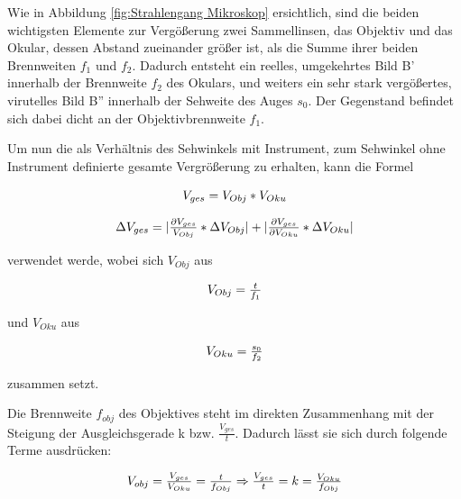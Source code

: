 \documentclass[12pt,a4paper,twoside]{article}
\begin{document}
\noindent
Wie in Abbildung \ref{fig:Strahlengang Mikroskop} ersichtlich, sind die beiden wichtigsten Elemente zur Vergößerung zwei Sammellinsen, das Objektiv und das Okular, dessen Abstand zueinander größer ist, als die Summe ihrer beiden Brennweiten $f_{1}$ und $f_{2}$. 
Dadurch entsteht ein reelles, umgekehrtes Bild B' innerhalb der Brennweite $f_{2}$ des Okulars, und weiters ein sehr stark vergößertes, virutelles Bild B'' innerhalb der Sehweite des Auges $s_{0}$. Der Gegenstand befindet sich dabei dicht an der Objektivbrennweite $f_{1}$. \newline

\noindent
Um nun die als Verhältnis des Sehwinkels mit Instrument, zum Sehwinkel ohne Instrument definierte gesamte Vergrößerung zu erhalten, kann die Formel

    \begin{equation}
        \label{eq:Gesamtvergrößerung}
        \centerline{$V_{ges}=V_{Obj}*V_{Oku}$}
    \end{equation}

    \begin{equation}
        \label{eq:Unsicherheit_Gesamtvergrößerung}
        \centerline{$\Delta V_{ges} = \vert \frac{\partial V_{ges}}{V_{Obj}} * \Delta V_{Obj} \vert + \vert \frac{\partial V_{ges}}{\partial V_{Oku}} * \Delta V_{Oku} \vert$}
    \end{equation}

\noindent
verwendet werde, wobei sich $V_{Obj}$ aus

\begin{equation}
    \label{eq:Objektivvergrößerung}
    \centerline{$V_{Obj}=\frac{t}{f_{1}}$}
\end{equation}

\noindent
und $V_{Oku}$ aus

\begin{equation}
    \label{eq:Okularvergrößerung}
    \centerline{$V_{Oku}=\frac{s_{0}}{f_{2}}$}
\end{equation}

\noindent
zusammen setzt. \newline

\noindent
Die Brennweite $f_{obj}$ des Objektives steht im direkten Zusammenhang mit der Steigung der Ausgleichsgerade k bzw. $\frac{V_{ges}}{t}$. Dadurch lässt sie sich durch folgende Terme ausdrücken:

\begin{equation}
    \label{eq:Objektivbrennweite}
    \centerline{$V_{obj}=\frac{V_{ges}}{V_{Oku}}=\frac{t}{f_{Obj}} \Rightarrow \frac{V_{ges}}{t} = k = \frac{V_{Oku}}{f_{Obj}}$}
\end{equation}
\end{document}

